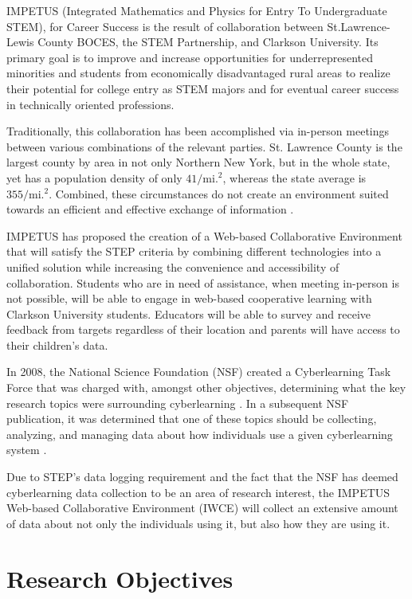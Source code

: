 IMPETUS (Integrated Mathematics and Physics for Entry To Undergraduate STEM), for Career Success is the result of collaboration between St.Lawrence-Lewis County BOCES, the STEM Partnership, and Clarkson University. Its primary goal is to improve and increase opportunities for underrepresented minorities and students from economically disadvantaged rural areas to realize their potential for college entry as STEM majors and for eventual career success in technically oriented professions.

Traditionally, this collaboration has been accomplished via in-person meetings between various combinations of the relevant parties. St. Lawrence County is the largest county by area in not only Northern New York, but in the whole state, yet has a population density of only $41/\mathrm{mi.}^2$, whereas the state average is $355/\mathrm{mi.}^2$. Combined, these circumstances do not create an environment suited towards an efficient and effective exchange of information \cite{nny-prism}.

IMPETUS has proposed the creation of a Web-based Collaborative Environment that will satisfy the STEP criteria by combining different technologies into a unified solution while increasing the convenience and accessibility of collaboration. Students who are in need of assistance, when meeting in-person is not possible, will be able to engage in web-based cooperative learning with Clarkson University students. Educators will be able to survey and receive feedback from targets regardless of their location and parents will have access to their children's data.

In 2008, the National Science Foundation (NSF) created a Cyberlearning Task Force that was charged with, amongst other objectives, determining what the key research topics were surrounding cyberlearning \cite{nsf-taskforce}. In a subsequent NSF publication, it was determined that one of these topics should be collecting, analyzing, and managing data about how individuals use a given cyberlearning system \cite{nsf-cyberlearning}.

Due to STEP's data logging requirement and the fact that the NSF has deemed cyberlearning data collection to be an area of research interest, the IMPETUS Web-based Collaborative Environment (IWCE) will collect an extensive amount of data about not only the individuals using it, but also how they are using it.

\section{Research Objectives}

